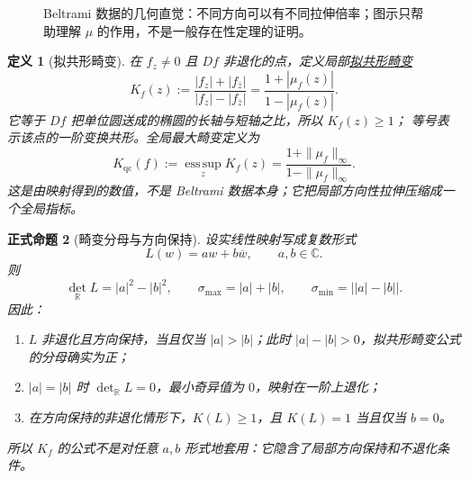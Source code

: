 \documentclass[UTF8,fontset=none,a4paper,11pt]{ctexart}
\theoremstyle{foundation-definition}
\newtheorem{definition}{定义}[section]
\theoremstyle{foundation-theorem}
\theoremstyle{foundation-proposition}
\newtheorem{proposition}[definition]{正式命题}
\theoremstyle{foundation-example}
\theoremstyle{foundation-remark}
\theoremstyle{foundation-theorem}
\newcommand{\term}[2]{\hyperref[#1]{#2}}
\begin{document}
\begin{figure}[htbp]
\centering
{}
\caption{Beltrami 数据的几何直觉：不同方向可以有不同拉伸倍率；图示只帮助理解 \(\mu\) 的作用，不是一般存在性定理的证明。}
\label{fig:beltrami-grid}
\end{figure}

\begin{definition}[拟共形畸变]\label{def:qc-distortion}
在 \(f_z\neq0\) 且 \(Df\) 非退化的点，定义局部\term{def:qc-distortion}{拟共形畸变}
\[
K_f(z):=\frac{|f_z|+|f_{\bar z}|}{|f_z|-|f_{\bar z}|}
=\frac{1+|\mu_f(z)|}{1-|\mu_f(z)|}.
\]
它等于 \(Df\) 把单位圆送成的椭圆的长轴与短轴之比，所以 \(K_f(z)\geq1\)；
等号表示该点的一阶变换共形。全局最大畸变定义为
\[
K_{\mathrm{qc}}(f):=\operatorname*{ess\,sup}_z K_f(z)
=\frac{1+\|\mu_f\|_\infty}{1-\|\mu_f\|_\infty}.
\]
这是由映射得到的数值，不是 Beltrami 数据本身；它把局部方向性拉伸压缩成一个全局指标。
\end{definition}

\begin{proposition}[畸变分母与方向保持]\label{prop:qc-denominator-orientation}
设实线性映射写成复数形式
\[
L(w)=aw+b\overline w,\qquad a,b\in\mathbb C.
\]
则
\[
\det_{\mathbb R}L=|a|^2-|b|^2,
\qquad
\sigma_{\max}=|a|+|b|,
\qquad
\sigma_{\min}=\bigl||a|-|b|\bigr|.
\]
因此：
\begin{enumerate}[label=(\roman*)]
  \item \(L\) 非退化且方向保持，当且仅当 \(|a|>|b|\)；此时
  \(|a|-|b|>0\)，拟共形畸变公式的分母确实为正；
  \item \(|a|=|b|\) 时 \(\det_{\mathbb R}L=0\)，最小奇异值为 \(0\)，映射在一阶上退化；
  \item 在方向保持的非退化情形下，\(K(L)\geq1\)，且 \(K(L)=1\) 当且仅当 \(b=0\)。
\end{enumerate}
所以 \(K_f\) 的公式不是对任意 \(a,b\) 形式地套用：它隐含了局部方向保持和不退化条件。
\end{proposition}
\end{document}
